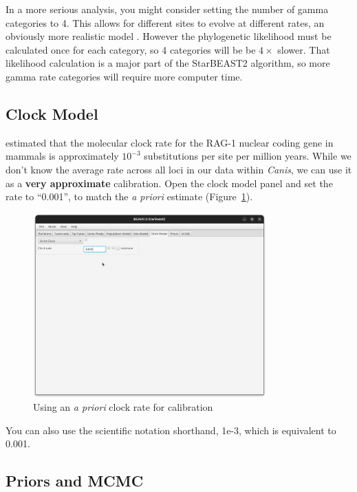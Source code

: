 \documentclass[12pt]{article}
\begin{document}
In a more serious analysis, you might consider setting the number of gamma
categories to 4. This allows for different sites to evolve at
different rates, an obviously more realistic model \parencite{Yang1994}. However
the phylogenetic likelihood must be calculated once for each category, so 4
categories will be be $4\times$ slower. That likelihood calculation is a major
part of the StarBEAST2 algorithm, so more gamma rate categories will require
more computer time.

\subsection{Clock Model}
\label{subsec:clockModel}

\cite{Hugall2007} estimated that the molecular
clock rate for the RAG-1 nuclear coding gene in mammals is approximately
$10^{-3}$ substitutions per site per million years. While we don't know
the average rate across all loci in our data within \textit{Canis}, we can
use it as a \textbf{very approximate} calibration. Open the clock model panel
and set the rate to ``0.001'', to match the \textit{a priori} estimate
(Figure~\ref{fig:strictClockModel}).

\begin{figure}[htb!]
\centering
\includegraphics[width=0.8\textwidth]{figures/strictClockModel.png}
\caption
{Using an \textit{a priori} clock rate for calibration}
\label{fig:strictClockModel}
\end{figure}

You can also use the scientific notation shorthand, 1e-3, which is equivalent
to 0.001.

\subsection{Priors and MCMC}
\label{subsec:MCMC}
\end{document}
